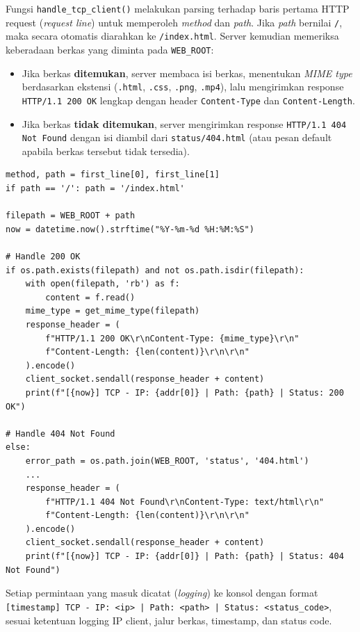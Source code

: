 \documentclass[11pt,a4paper]{article}
\begin{document}
Fungsi \texttt{handle\_tcp\_client()} melakukan parsing terhadap baris pertama HTTP request (\textit{request line}) untuk memperoleh \textit{method} dan \textit{path}. Jika \textit{path} bernilai \texttt{/}, maka secara otomatis diarahkan ke \texttt{/index.html}. Server kemudian memeriksa keberadaan berkas yang diminta pada \texttt{WEB\_ROOT}:

\begin{itemize}[noitemsep]
    \item Jika berkas \textbf{ditemukan}, server membaca isi berkas, menentukan \textit{MIME type} berdasarkan ekstensi (\texttt{.html}, \texttt{.css}, \texttt{.png}, \texttt{.mp4}), lalu mengirimkan response \texttt{HTTP/1.1 200 OK} lengkap dengan header \texttt{Content-Type} dan \texttt{Content-Length}.
    \item Jika berkas \textbf{tidak ditemukan}, server mengirimkan response \texttt{HTTP/1.1 404 Not Found} dengan isi diambil dari \texttt{status/404.html} (atau pesan default apabila berkas tersebut tidak tersedia).
\end{itemize}

\begin{lstlisting}[caption={Penanganan request dan pembentukan response HTTP pada \texttt{handle\_tcp\_client()}}, label={lst:handle-tcp}]
method, path = first_line[0], first_line[1]
if path == '/': path = '/index.html'

filepath = WEB_ROOT + path
now = datetime.now().strftime("%Y-%m-%d %H:%M:%S")

# Handle 200 OK
if os.path.exists(filepath) and not os.path.isdir(filepath):
    with open(filepath, 'rb') as f:
        content = f.read()
    mime_type = get_mime_type(filepath)
    response_header = (
        f"HTTP/1.1 200 OK\r\nContent-Type: {mime_type}\r\n"
        f"Content-Length: {len(content)}\r\n\r\n"
    ).encode()
    client_socket.sendall(response_header + content)
    print(f"[{now}] TCP - IP: {addr[0]} | Path: {path} | Status: 200 OK")

# Handle 404 Not Found
else:
    error_path = os.path.join(WEB_ROOT, 'status', '404.html')
    ...
    response_header = (
        f"HTTP/1.1 404 Not Found\r\nContent-Type: text/html\r\n"
        f"Content-Length: {len(content)}\r\n\r\n"
    ).encode()
    client_socket.sendall(response_header + content)
    print(f"[{now}] TCP - IP: {addr[0]} | Path: {path} | Status: 404 Not Found")
\end{lstlisting}

Setiap permintaan yang masuk dicatat (\textit{logging}) ke konsol dengan format \texttt{[timestamp] TCP - IP: \textless ip\textgreater\ | Path: \textless path\textgreater\ | Status: \textless status\_code\textgreater}, sesuai ketentuan logging IP client, jalur berkas, timestamp, dan status code.
\end{document}
